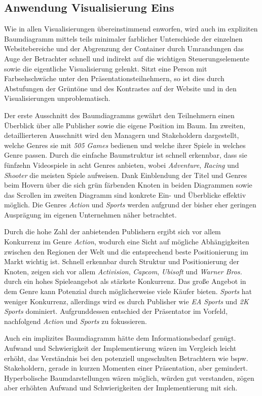 \documentclass[usegeometry=true]{scrartcl}
\begin{document}
\subsection{Anwendung Visualisierung Eins}
Wie in allen Visualisierungen übereinstimmend enworfen, wird auch im expliziten Baumdiagramm mittels teils minimaler farblicher Unterschiede der einzelnen Websitebereiche und der Abgrenzung der Container durch Umrandungen 
das Auge der Betrachter schnell und indirekt auf die wichtigen Steuerungselemente sowie die eigentliche Visualisierung gelenkt.
Sitzt eine Person mit Farbsehschwäche unter den Präsentationsteilnehmern, so ist dies durch Abstufungen der Grüntöne und des Kontrastes auf der Website und in den Visualisierungen unproblematisch. 

Der erste Ausschnitt des Baumdiagramms gewährt den Teilnehmern einen Überblick über alle Publisher sowie die eigene Position im Baum.
Im zweiten, detaillierteren Ausschnitt wird den Managern und Stakeholdern dargestellt, welche Genres sie mit \textit{505 Games} bedienen und welche ihrer Spiele in welches Genre passen.
Durch die einfache Baumstruktur ist schnell erkennbar, dass sie fünfzehn Videospiele in acht Genres anbieten, wobei \textit{Adventure}, \textit{Racing} und \textit{Shooter} die meisten Spiele aufweisen.
Dank Einblendung der Titel und Genres beim Hovern über die sich grün färbenden Knoten in beiden Diagrammen sowie das Scrollen im zweiten Diagramm sind konkrete Ein- und Überblicke effektiv möglich. 
Die Genres \textit{Action} und \textit{Sports} werden aufgrund der bisher eher geringen Ausprägung im eigenen Unternehmen näher betrachtet. 

Durch die hohe Zahl der anbietenden Publishern ergibt sich vor allem Konkurrenz im Genre \textit{Action}, wodurch eine Sicht auf mögliche Abhängigkeiten zwischen den Regionen der Welt und die entsprechend beste Positionierung im Markt wichtig ist.
Schnell erkennbar durch Struktur und Positionierung der Knoten, zeigen sich vor allem \textit{Activision}, \textit{Capcom}, \textit{Ubisoft} und \textit{Warner Bros.} durch ein hohes Spieleangebot als stärkste Konkurrenz. 
Das große Angebot in dem Genre kann Potenzial durch möglicherweise viele Käufer bieten.
\textit{Sports} hat weniger Konkurrenz, allerdings wird es durch Publisher wie \textit{EA Sports} und \textit{2K Sports} dominiert.
Aufgrunddessen entschied der Präsentator im Vorfeld, nachfolgend \textit{Action} und \textit{Sports} zu fokussieren.

Auch ein implizites Baumdiagramm hätte dem Informationsbedarf genügt. 
Aufwand und Schwierigkeit der Implementierung wären im Vergleich leicht erhöht, das Verständnis bei den potenziell ungeschulten Betrachtern wie bspw. Stakeholdern, gerade in kurzen Momenten einer Präsentation, aber gemindert. 
Hyperbolische Baumdarstellungen wären möglich, würden gut verstanden, zögen aber erhöhten Aufwand und Schwierigkeiten der Implementierung mit sich. 
\end{document}
